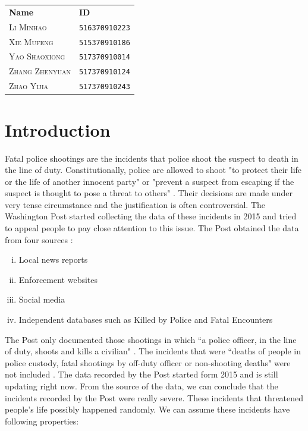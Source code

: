 \documentclass[11pt,a4paper,english]{article}
\begin{document}
\begin{table}[h!]
\centering
\begin{tabular}{ll}
\textbf{Name} & \textbf{ID} \\
\textsc{Li Minhao} & \texttt{516370910223} \\
\textsc{Xie Mufeng} &  \texttt{515370910186} \\
\textsc{Yao Shaoxiong} & \texttt{517370910014} \\
\textsc{Zhang Zhenyuan} & \texttt{517370910124} \\
\textsc{Zhao Yijia} &  \texttt{517370910243} \\
\end{tabular}
\end{table}
\newpage
\begin{abstract}
\end{abstract}
\newpage
\tableofcontents
\newpage\section{Introduction}
Fatal police shootings are the incidents that police shoot the suspect to death in the line of duty. Constitutionally, police are allowed to shoot "to protect their life or the life of another innocent party" or "prevent a suspect from escaping if the suspect is thought to pose a threat to others" \cite{police}. Their decisions are made under very tense circumstance and the justification is often controversial. The Washington Post started collecting the data of these incidents in 2015 and tried to appeal people to pay close attention to this issue. The Post obtained the data from four sources \cite{post}: 
\begin{enumerate}[(i)]
    \item Local news reports
    \item Enforcement websites
    \item Social media
	\item Independent databases such as Killed by Police and Fatal Encounters
\end{enumerate}
The Post only documented those shootings in which ``a police officer, in the line of duty, shoots and kills a civilian" \cite{post}. The incidents that were ``deaths of people in police custody, fatal shootings by off-duty officer or non-shooting deaths" were not included \cite{post}. The data recorded by the Post started form 2015 and is still updating right now. From the source of the data, we can conclude that the incidents recorded by the Post were really severe. These incidents that threatened people's life possibly happened randomly. We can assume these incidents have following properties:
\end{document}
